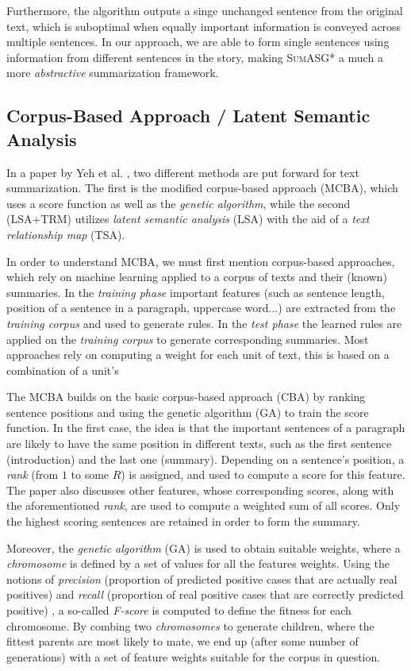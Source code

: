 Furthermore, the algorithm outputs a singe unchanged sentence from the original text, which is suboptimal when equally important information is conveyed across multiple sentences. In our approach, we are able to form single sentences using information from different sentences in the story, making \textsc{SumASG*} a much a more \textit{abstractive} summarization framework.

\subsection{Corpus-Based Approach / Latent Semantic Analysis}
\label{subsec:mcba_lsa_trm}

In a paper by Yeh et al. \cite{yeh_text_2005}, two different methods are put forward for text summarization. The first is the modified corpus-based approach (MCBA), which uses a score function as well as the \textit{genetic algorithm}, while the second (LSA+TRM) utilizes \textit{latent semantic analysis} (LSA) with the aid of a \textit{text relationship map} (TSA).

\mbox{}

In order to understand MCBA, we must first mention corpus-based approaches, which rely on machine learning applied to a corpus of texts and their (known) summaries. In the \textit{training phase} important features (such as sentence length, position of a sentence in a paragraph, uppercase word...) are extracted from the \textit{training corpus} and used to generate rules. In the \textit{test phase} the learned rules are applied on the \textit{training corpus} to generate corresponding summaries. Most approaches rely on computing a weight for each unit of text, this is based on a combination of a unit's%

The MCBA builds on the basic corpus-based approach (CBA) by ranking sentence positions and using the genetic algorithm (GA) to train the score function. In the first case, the idea is that the important sentences of a paragraph are likely to have the same position in different texts, such as the first sentence (introduction) and the last one (summary). Depending on a sentence's position, a \textit{rank} (from $1$ to some $R$) is assigned, and used to compute a score for this feature. The paper also discusses other features, whose corresponding scores, along with the aforementioned \textit{rank}, are used to compute a weighted sum of all scores. Only the highest scoring sentences are retained in order to form the summary.

Moreover, the \textit{genetic algorithm} (GA) is used to obtain suitable weights, where a \textit{chromosome} is defined by a set of values for all the features weights. Using the notions of \textit{precision} (proportion of predicted positive cases that are actually real positives) and \textit{recall} (proportion of real positive cases that are correctly predicted positive) \cite{powers_evaluation_2011}, a so-called \textit{F-score} is computed to define the fitness for each chromosome. By combing two \textit{chromosomes} to generate children, where the fittest parents are most likely to mate, we end up (after some number of generations) with a set of feature weights suitable for the corpus in question.

